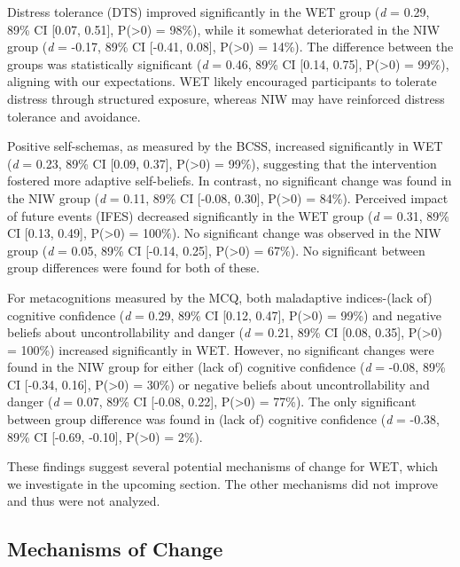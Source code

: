 \documentclass[
  man,floatsintext]{apa7}
\begin{document}
Distress tolerance (DTS) improved significantly in the WET group (\emph{d} = 0.29, 89\% CI {[}0.07, 0.51{]}, P(\textgreater0) = 98\%), while it somewhat deteriorated in the NIW group (\emph{d} = -0.17, 89\% CI {[}-0.41, 0.08{]}, P(\textgreater0) = 14\%).
The difference between the groups was statistically significant (\emph{d} = 0.46, 89\% CI {[}0.14, 0.75{]}, P(\textgreater0) = 99\%), aligning with our expectations.
WET likely encouraged participants to tolerate distress through structured exposure, whereas NIW may have reinforced distress tolerance and avoidance.

Positive self-schemas, as measured by the BCSS, increased significantly in WET (\emph{d} = 0.23, 89\% CI {[}0.09, 0.37{]}, P(\textgreater0) = 99\%), suggesting that the intervention fostered more adaptive self-beliefs.
In contrast, no significant change was found in the NIW group (\emph{d} = 0.11, 89\% CI {[}-0.08, 0.30{]}, P(\textgreater0) = 84\%).
Perceived impact of future events (IFES) decreased significantly in the WET group (\emph{d} = 0.31, 89\% CI {[}0.13, 0.49{]}, P(\textgreater0) = 100\%).
No significant change was observed in the NIW group (\emph{d} = 0.05, 89\% CI {[}-0.14, 0.25{]}, P(\textgreater0) = 67\%).
No significant between group differences were found for both of these.

For metacognitions measured by the MCQ, both maladaptive indices-(lack of) cognitive confidence (\emph{d} = 0.29, 89\% CI {[}0.12, 0.47{]}, P(\textgreater0) = 99\%) and negative beliefs about uncontrollability and danger (\emph{d} = 0.21, 89\% CI {[}0.08, 0.35{]}, P(\textgreater0) = 100\%) increased significantly in WET.
However, no significant changes were found in the NIW group for either (lack of) cognitive confidence (\emph{d} = -0.08, 89\% CI {[}-0.34, 0.16{]}, P(\textgreater0) = 30\%) or negative beliefs about uncontrollability and danger (\emph{d} = 0.07, 89\% CI {[}-0.08, 0.22{]}, P(\textgreater0) = 77\%).
The only significant between group difference was found in (lack of) cognitive confidence (\emph{d} = -0.38, 89\% CI {[}-0.69, -0.10{]}, P(\textgreater0) = 2\%).

These findings suggest several potential mechanisms of change for WET, which we investigate in the upcoming section.
The other mechanisms did not improve and thus were not analyzed.

\subsection{Mechanisms of Change}\label{mechanisms-of-change}
\end{document}
